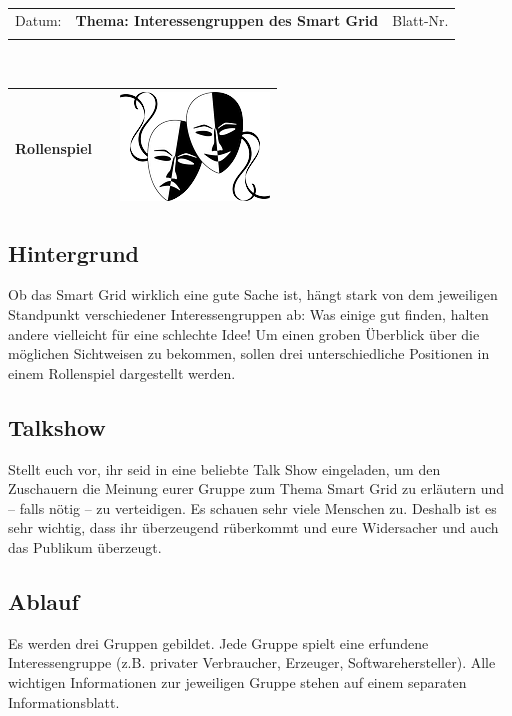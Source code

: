 \documentclass[11pt,a4paper,DIV=10,BCOR=0mm]{scrartcl}
\begin{document}
%
\setlength{\tabcolsep}{3mm} %
\noindent
\begin{tabularx}{\textwidth}{|l|T|l|}
\hline
Datum: & \rule{0pt}{5mm} \textbf{\textsf{Thema: Interessengruppen des Smart Grid}} & Blatt-Nr. \\
&&\\ 
\hline
\end{tabularx}
\rule{0pt}{3mm} \\
\setlength{\tabcolsep}{0mm} %
\begin{tabularx}{\linewidth}{lXr}
{\Large\textsf{\textbf{Rollenspiel}}} & &
\includegraphics[scale=0.3]{images/mask}\\  %
\hline
\end{tabularx}
\subsection*{Hintergrund}
Ob %
das Smart Grid wirklich eine gute Sache ist, hängt stark von dem jeweiligen Standpunkt
verschiedener Interessengruppen ab: Was einige gut finden, halten andere vielleicht für eine
schlechte Idee! Um einen groben Überblick über die möglichen Sichtweisen zu bekommen,
sollen drei unterschiedliche Positionen in einem Rollenspiel dargestellt werden.
\subsection*{Talkshow}
Stellt euch vor, ihr seid in eine beliebte Talk Show eingeladen, um den Zu\-schau\-ern
die Meinung eurer Gruppe zum Thema Smart Grid zu erläutern und -- falls nötig -- zu verteidigen. Es schauen sehr viele Menschen zu. Deshalb ist es sehr wichtig, dass ihr überzeugend rüberkommt und eure Widersacher und auch das Publikum überzeugt.
\subsection*{Ablauf}
Es werden drei Gruppen gebildet. Jede Gruppe spielt eine erfundene Interessengruppe (z.B. privater Verbraucher, Erzeuger, Softwarehersteller). Alle wichtigen Informationen zur jeweiligen Gruppe stehen auf einem separaten Informationsblatt.
\end{document}
